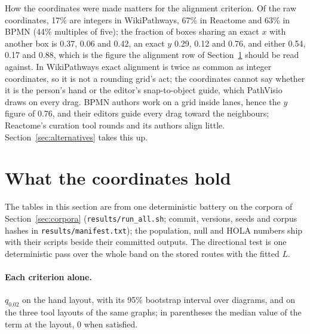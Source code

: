 \documentclass[11pt]{article}
\begin{document}
How the coordinates were made matters for the alignment criterion. Of the raw coordinates,
17\% are integers in WikiPathways, 67\% in Reactome and 63\% in BPMN (44\% multiples of
five); the fraction of boxes sharing an exact $x$ with another box is 0.37, 0.06 and 0.42,
an exact $y$ 0.29, 0.12 and 0.76, and either 0.54, 0.17 and 0.88, which is the figure the
alignment row of Section~\ref{sec:results} should be read against. In WikiPathways exact
alignment is twice as common as integer coordinates, so it is not a rounding grid's act;
the coordinates cannot say whether it is the person's hand or the editor's snap-to-object
guide, which PathVisio draws on every drag. BPMN authors work on a grid inside
lanes, hence the $y$ figure of 0.76, and their editors guide every
drag toward the neighbours; Reactome's curation tool rounds and its authors align little.
Section~\ref{sec:alternatives} takes this up.


\section{What the coordinates hold}\label{sec:results}




The tables in this section are from one deterministic battery on the corpora of
Section~\ref{sec:corpora} (\texttt{results/run\_all.sh}; commit, versions, seeds and
corpus hashes in \texttt{results/manifest.txt}); the population,
null and HOLA numbers ship with their scripts beside their committed outputs. The
directional test is one deterministic pass over the
whole band on the stored routes with the fitted $L$.

\paragraph{Each criterion alone.} $q_{0.02}$ on the hand layout, with its 95\% bootstrap
interval over diagrams, and on the three tool layouts of the same graphs; in parentheses
the median value of the term at the layout, 0 when satisfied.
\end{document}
